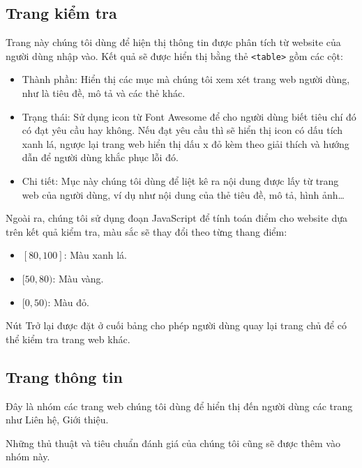 \subsection{Trang kiểm tra}
Trang này chúng tôi dùng để hiện thị thông tin được phân tích từ website của người dùng nhập vào. Kết quả sẽ được hiển thị bằng thẻ \texttt{<table>} gồm các cột:
\begin{itemize}
	\item Thành phần: Hiển thị các mục mà chúng tôi xem xét trang web người dùng, như là tiêu đề, mô tả và các thẻ khác.
	\item Trạng thái: Sử dụng icon từ Font Awesome để cho người dùng biết tiêu chí đó có đạt yêu cầu hay không. Nếu đạt yêu cầu thì sẽ hiển thị icon có dấu tích xanh lá, ngược lại trang web hiển thị dấu x đỏ kèm theo giải thích và hướng dẫn để người dùng khắc phục lỗi đó.
	\item Chi tiết: Mục này chúng tôi dùng để liệt kê ra nội dung được lấy từ trang web của người dùng, ví dụ như nội dung của thẻ tiêu đề, mô tả, hình ảnh\ldots
\end{itemize}
\par
Ngoài ra, chúng tôi sử dụng đoạn JavaScript để tính toán điểm cho website dựa trên kết quả kiểm tra, màu sắc sẽ thay đổi theo từng thang điểm:
\begin{itemize}
	\item $[80, 100]$: Màu xanh lá.
	\item $[50, 80)$: Màu vàng.
	\item $[0, 50)$: Màu đỏ.
\end{itemize}
\par
Nút Trở lại được đặt ở cuối bảng cho phép người dùng quay lại trang chủ để có thể kiểm tra trang web khác.
\subsection{Trang thông tin}
Đây là nhóm các trang web chúng tôi dùng để hiển thị đến người dùng các trang như Liên hệ, Giới thiệu.
\\\par
Những thủ thuật và tiêu chuẩn đánh giá của chúng tôi cũng sẽ được thêm vào nhóm này.
